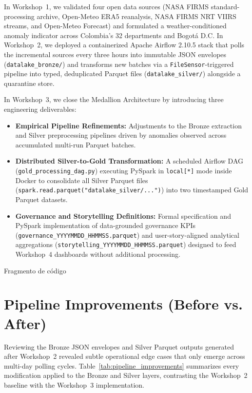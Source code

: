 \documentclass[11pt,letterpaper]{article}
\begin{document}
In Workshop~1, we validated four open data sources (NASA FIRMS standard-processing archive, Open-Meteo ERA5 reanalysis, NASA FIRMS NRT VIIRS streams, and Open-Meteo Forecast) and formulated a weather-conditioned anomaly indicator across Colombia's 32 departments and Bogotá D.C. In Workshop~2, we deployed a containerized Apache Airflow 2.10.5 stack that polls the incremental sources every three hours into immutable JSON envelopes (\texttt{datalake\_bronze/}) and transforms new batches via a \texttt{FileSensor}-triggered pipeline into typed, deduplicated Parquet files (\texttt{datalake\_silver/}) alongside a quarantine store.

In Workshop~3, we close the Medallion Architecture by introducing three engineering deliverables:
\begin{itemize}
  \item \textbf{Empirical Pipeline Refinements:} Adjustments to the Bronze extraction and Silver preprocessing pipelines driven by anomalies observed across accumulated multi-run Parquet batches.
  \item \textbf{Distributed Silver-to-Gold Transformation:} A scheduled Airflow DAG (\texttt{gold\_processing\_dag.py}) executing PySpark in \texttt{local[*]} mode inside Docker to consolidate all Silver Parquet files (\texttt{spark.read.parquet("datalake\_silver/...")}) into two timestamped Gold Parquet datasets.
  \item \textbf{Governance and Storytelling Definitions:} Formal specification and PySpark implementation of data-grounded governance KPIs (\texttt{governance\_YYYYMMDD\_HHMMSS.parquet}) and user-story-aligned analytical aggregations (\texttt{storytelling\_YYYYMMDD\_HHMMSS.parquet}) designed to feed Workshop~4 dashboards without additional processing.
\end{itemize}

Fragmento de código
\section{Pipeline Improvements (Before vs. After)}

Reviewing the Bronze JSON envelopes and Silver Parquet outputs generated after Workshop~2 revealed subtle operational edge cases that only emerge across multi-day polling cycles. Table~\ref{tab:pipeline_improvements} summarizes every modification applied to the Bronze and Silver layers, contrasting the Workshop~2 baseline with the Workshop~3 implementation.
\end{document}

